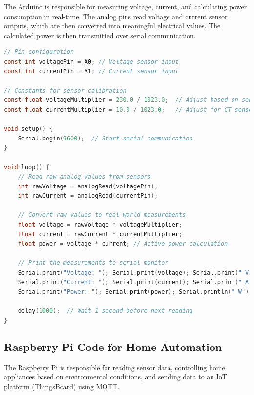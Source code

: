 \documentclass[a4paper,12pt]{report}
\begin{document}
The Arduino is responsible for measuring voltage, current, and calculating power consumption in real-time. The analog pins read voltage and current sensor outputs, which are then converted into meaningful electrical values. The calculated power is then transmitted over serial communication.
\clearpage

\begin{lstlisting}[language=C]
// Pin configuration
const int voltagePin = A0; // Voltage sensor input
const int currentPin = A1; // Current sensor input

// Constants for sensor calibration
const float voltageMultiplier = 230.0 / 1023.0;  // Adjust based on sensor specs
const float currentMultiplier = 10.0 / 1023.0;   // Adjust for CT sensor scaling

void setup() {
    Serial.begin(9600);  // Start serial communication
}

void loop() {
    // Read raw analog values from sensors
    int rawVoltage = analogRead(voltagePin);
    int rawCurrent = analogRead(currentPin);
    
    // Convert raw values to real-world measurements
    float voltage = rawVoltage * voltageMultiplier;
    float current = rawCurrent * currentMultiplier;
    float power = voltage * current; // Active power calculation

    // Print the measurements to serial monitor
    Serial.print("Voltage: "); Serial.print(voltage); Serial.print(" V, ");
    Serial.print("Current: "); Serial.print(current); Serial.print(" A, ");
    Serial.print("Power: "); Serial.print(power); Serial.println(" W");

    delay(1000);  // Wait 1 second before next reading
}
\end{lstlisting}


\subsection{Raspberry Pi Code for Home Automation}

The Raspberry Pi is responsible for reading sensor data, controlling home appliances based on environmental conditions, and sending data to an IoT platform (ThingsBoard) using MQTT.
\clearpage
\end{document}
